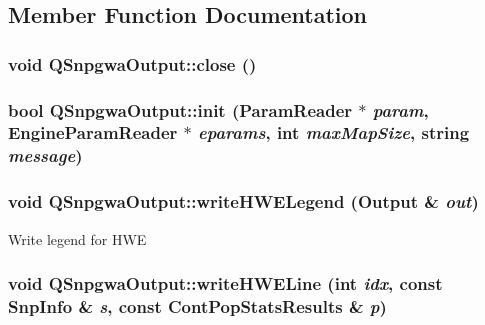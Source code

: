 \subsection{Member Function Documentation}
\hypertarget{classQSnpgwaOutput_ab10d065c1d34ed8be33a423b6d30f297}{
\subsubsection[{close}]{\setlength{\rightskip}{0pt plus 5cm}void QSnpgwaOutput::close ()}}
\label{classQSnpgwaOutput_ab10d065c1d34ed8be33a423b6d30f297}
\hypertarget{classQSnpgwaOutput_acea3297b5738eb71047385cd4c5ab1e8}{
\subsubsection[{init}]{\setlength{\rightskip}{0pt plus 5cm}bool QSnpgwaOutput::init ({\bf ParamReader} $\ast$ {\em param}, \/  {\bf EngineParamReader} $\ast$ {\em eparams}, \/  int {\em maxMapSize}, \/  string {\em message})}}
\label{classQSnpgwaOutput_acea3297b5738eb71047385cd4c5ab1e8}
\hypertarget{classQSnpgwaOutput_a2b0ca6d197ec6b9155bc051e29627665}{
\subsubsection[{writeHWELegend}]{\setlength{\rightskip}{0pt plus 5cm}void QSnpgwaOutput::writeHWELegend ({\bf Output} \& {\em out})}}
\label{classQSnpgwaOutput_a2b0ca6d197ec6b9155bc051e29627665}
Write legend for HWE \hypertarget{classQSnpgwaOutput_abeeb5f390c652631a711d1aa1f847d87}{
\subsubsection[{writeHWELine}]{\setlength{\rightskip}{0pt plus 5cm}void QSnpgwaOutput::writeHWELine (int {\em idx}, \/  const {\bf SnpInfo} \& {\em s}, \/  const {\bf ContPopStatsResults} \& {\em p})}}

